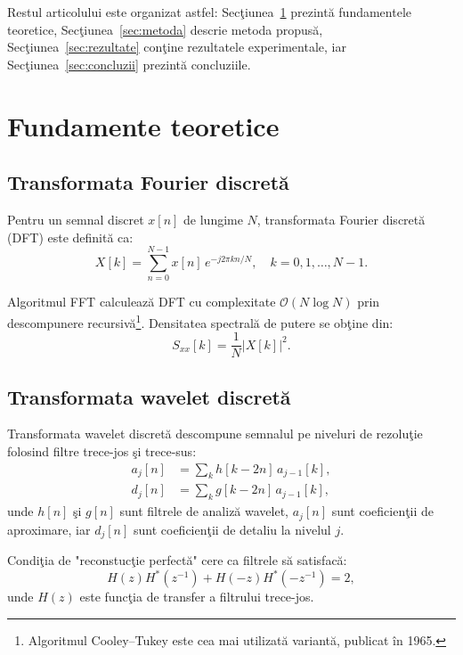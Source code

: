 \documentclass[12pt,a4paper]{article}
\begin{document}
Restul articolului este organizat astfel: Secţiunea~\ref{sec:fundamente}
prezintă fundamentele teoretice, Secţiunea~\ref{sec:metoda} descrie
metoda propusă, Secţiunea~\ref{sec:rezultate} conţine rezultatele
experimentale, iar Secţiunea~\ref{sec:concluzii} prezintă concluziile.

\section{Fundamente teoretice}
\label{sec:fundamente}

\subsection{Transformata Fourier discretă}

Pentru un semnal discret $x[n]$ de lungime $N$, transformata Fourier
discretă (DFT) este definită ca:
\begin{equation}
\label{eq:dft}
X[k] = \sum_{n=0}^{N-1} x[n] \, e^{-j 2\pi kn/N}, \quad k = 0, 1, \ldots, N-1.
\end{equation}

Algoritmul FFT calculează DFT cu complexitate $\mathcal{O}(N \log N)$
prin descompunere recursivă\footnote{Algoritmul Cooley--Tukey este cea
mai utilizată variantă, publicat în 1965.}. Densitatea spectrală de
putere se obţine din:
\begin{equation}
\label{eq:psd}
S_{xx}[k] = \frac{1}{N} |X[k]|^2.
\end{equation}

\subsection{Transformata wavelet discretă}

Transformata wavelet discretă descompune semnalul pe niveluri de
rezoluţie folosind filtre trece-jos şi trece-sus:
\begin{align}
\label{eq:dwt_low}
a_j[n] &= \sum_k h[k-2n] \, a_{j-1}[k], \\
\label{eq:dwt_high}
d_j[n] &= \sum_k g[k-2n] \, a_{j-1}[k],
\end{align}
unde $h[n]$ şi $g[n]$ sunt filtrele de analiză wavelet, $a_j[n]$ sunt
coeficienţii de aproximare, iar $d_j[n]$ sunt coeficienţii de detaliu
la nivelul $j$.

Condiţia de "reconstucţie perfectă" cere ca filtrele să satisfacă:
\begin{equation}
\label{eq:pr}
H(z)H^*(z^{-1}) + H(-z)H^*(-z^{-1}) = 2,
\end{equation}
unde $H(z)$ este funcţia de transfer a filtrului trece-jos.
\end{document}

